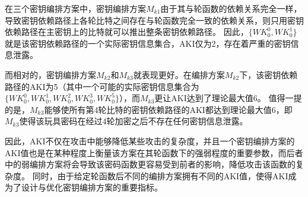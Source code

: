 在三个密钥编排方案中，密钥编排方案$M_{k1}$由于其与轮函数的依赖关系完全一样，导致密钥依赖路径上各轮比特之间存在与轮函数完全一致的依赖关系，则只用密钥依赖路径在主密钥上的比特就可以推出整条密钥依赖路径。
因此，$\{WK_0^0,WK_0^1\}$就是该密钥依赖路径的一个实际密钥信息集合，AKI仅为2，存在着严重的密钥信息泄露。

而相对的，密钥编排方案$M_{k2}$和$M_{k3}$就表现更好。在编排方案$M_{k2}$下，该密钥依赖路径的AKI为5（其中一个可能的实际密钥信息集合为$\{WK_0^0,WK_0^1,WK_0^2,WK_0^3,WK_0^5\}$），而$M_{k3}$更让AKI达到了理论最大值6。
值得一提的是，$M_{k3}$能够使所有第4轮比特的密钥依赖路径的AKI都达到理论最大值6，即$M_{k3}$使得该玩具密码在经过4轮加密之后不存在任何密钥信息泄露。

因此，AKI不仅在攻击中能够降低某些攻击的复杂度，并且一个密钥编排方案的AKI值也是在某种程度上衡量该方案在其轮函数下的强弱程度的重要参数，而后者中的弱编排方案将会导致该密码函数更容易受到前者的影响，降低攻击该函数的复杂度。
同时，由于给定轮函数后不同的编排方案拥有不同的AKI值，使得AKI成为了设计与优化密钥编排方案的重要指标。
